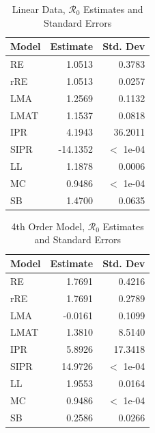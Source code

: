 \documentclass[12pt]{article}
\newcommand{\rr}{\ensuremath{\mathcal{R}_0}}
\begin{document}
\begin{table}[H]
	
	\centering
	\begin{tabular}[t]{l|r|r}
		\hline
		Model & Estimate & Std. Dev\\
		\hline
		RE & 1.0513 & 0.3783\\
		\hline
		rRE & 1.0513 & 0.0257\\
		\hline
		LMA & 1.2569 & 0.1132\\
		\hline
		LMAT & 1.1537 & 0.0818\\
		\hline
		IPR & 4.1943 & 36.2011\\
		\hline
		SIPR & -14.1352 & $<$ 1e-04\\
		\hline
		LL & 1.1878 & 0.0006\\
		\hline
		MC & 0.9486 & $<$ 1e-04\\
		\hline
		SB & 1.4700 & 0.0635\\
		\hline
	\end{tabular}
	\caption{Linear Data, $\rr$ Estimates and Standard Errors}
\end{table}

\begin{table}[H]
	
	
	\centering
	\begin{tabular}[t]{l|r|r}
		\hline
		Model & Estimate & Std. Dev\\
		\hline
		RE & 1.7691 & 0.4216\\
		\hline
		rRE & 1.7691 & 0.2789\\
		\hline
		LMA & -0.0161 & 0.1099\\
		\hline
		LMAT & 1.3810 & 8.5140\\
		\hline
		IPR & 5.8926 & 17.3418\\
		\hline
		SIPR & 14.9726 & $<$ 1e-04\\
		\hline
		LL & 1.9553 & 0.0164\\
		\hline
		MC & 0.9486 & $<$ 1e-04\\
		\hline
		SB & 0.2586 & 0.0266\\
		\hline
	\end{tabular}
	\caption{4th Order Model, $\rr$ Estimates and Standard Errors}
\end{table}
\end{document}
